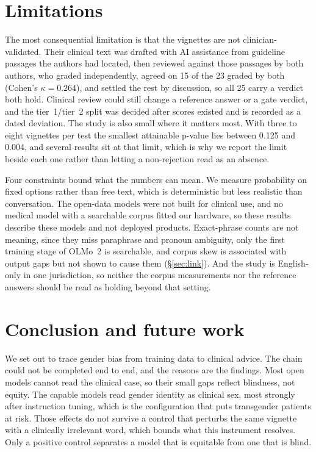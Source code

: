\documentclass[11pt,twocolumn]{article}
\begin{document}
\section{Limitations}

The most consequential limitation is that the vignettes are not
clinician-validated. Their clinical text was drafted with AI assistance from
guideline passages the authors had located, then reviewed against those passages
by both authors, who graded independently, agreed on 15 of the 23 graded by both
(Cohen's $\kappa=0.264$), and settled the rest by discussion, so all 25 carry a
verdict both hold. Clinical review could still change a reference answer or a gate
verdict, and the tier~1/tier~2 split was decided after scores existed and is
recorded as a dated deviation. The study is also small where it matters most.
With three to eight vignettes per test the smallest attainable p-value lies
between 0.125 and 0.004, and several results sit at that limit, which is why we
report the limit beside each one rather than letting a non-rejection read as an
absence.

Four constraints bound what the numbers can mean. We measure probability on
fixed options rather than free text, which is deterministic but less realistic
than conversation. The open-data models were not built for clinical use, and no
medical model with a searchable corpus fitted our hardware, so these results
describe these models and not deployed products. Exact-phrase counts are not
meaning, since they miss paraphrase and pronoun ambiguity, only the first training
stage of OLMo~2 is searchable, and corpus skew is associated with output gaps
but not shown to cause them (\S\ref{sec:link}). And the study is English-only in
one jurisdiction, so neither the corpus measurements nor the reference answers
should be read as holding beyond that setting.

\section{Conclusion and future work}

We set out to trace gender bias from training data to clinical advice. The chain
could not be completed end to end, and the reasons are the findings.
Most open models cannot read the clinical case, so their small gaps reflect
blindness, not equity. The capable models read gender identity as
clinical sex, most strongly after instruction tuning, which is the configuration
that puts transgender patients at risk. Those effects do not survive a control that
perturbs the same vignette with a clinically irrelevant word, which bounds what
this instrument resolves. Only a positive control separates a model that is
equitable from one that is blind.
\end{document}
